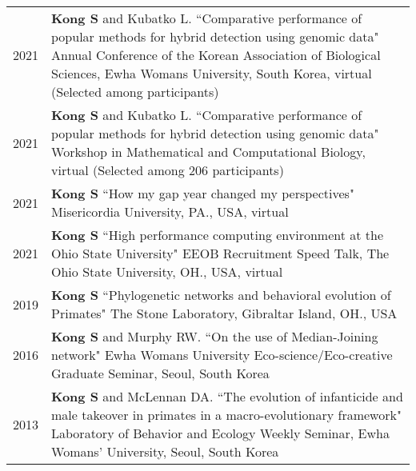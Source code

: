 \documentclass[11pt]{article}
\begin{document}
\begin{longtable}{p{}  p{}}

2021 & \textbf{Kong S} and Kubatko L.  ``Comparative performance of popular methods for hybrid detection using genomic data" Annual Conference of the Korean Association of Biological Sciences, Ewha Womans University, South Korea, virtual (Selected among participants)\vspace{5pt}\\

2021 & \textbf{Kong S} and Kubatko L.  ``Comparative performance of popular methods for hybrid detection using genomic data" Workshop in Mathematical and Computational Biology, virtual (Selected among 206 participants)\textit{} \vspace{5pt} \\ 

2021 & \textbf{Kong S} ``How my gap year changed my perspectives" Misericordia University, PA., USA, virtual \vspace{5pt} \\  

2021 & \textbf{Kong S} ``High performance computing environment at the Ohio State University" EEOB Recruitment Speed Talk, The Ohio State University, OH., USA, virtual \vspace{5pt} \\ 

2019 &  \textbf{Kong S} ``Phylogenetic networks and behavioral evolution of Primates" The Stone Laboratory, Gibraltar Island, OH., USA \vspace{5pt} \\ 

2016 & \textbf{Kong S} and Murphy RW. ``On the use of Median-Joining network" Ewha Womans University Eco-science/Eco-creative Graduate Seminar, Seoul, South Korea \vspace{5pt} \\

2013 & \textbf{Kong S} and McLennan DA. ``The evolution of infanticide and male takeover in primates in a macro-evolutionary framework" Laboratory of Behavior and Ecology Weekly Seminar, Ewha Womans’ University, Seoul, South Korea \vspace{5pt} \\ 
\end{longtable}
\end{document}
